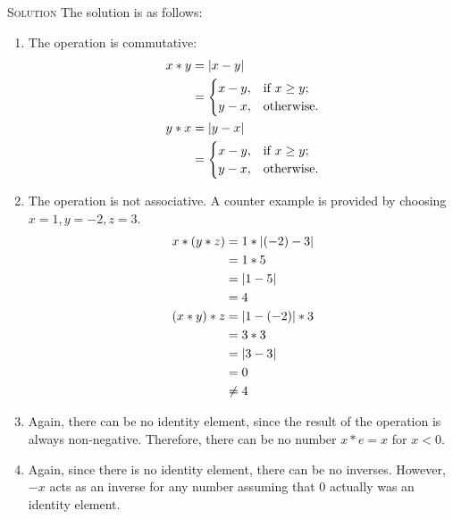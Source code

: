 \documentclass{amsart}
\newcommand{\Solution}{\textsc{Solution}\xspace}
\begin{document}
\begin{enumerate}
   \noindent \Solution The solution is as follows:
   \begin{enumerate}

      \item The operation is commutative:
      \begin{align*}
         x * y & = | x - y |           \\
	       & =
	       \begin{cases}
	          x - y,     & \text{if $x \ge y$;} \\
		  y - x,     & \text{otherwise.}
	       \end{cases} \notag \\
	 y * x & = | y - x |           \\
	       & =
	       \begin{cases}
	          x - y,     & \text{if $x \ge y$;} \\
		  y - x,     & \text{otherwise.}
	       \end{cases} \notag 
      \end{align*}

      \item The operation is not associative. A counter example is provided
      by choosing $x = 1, y = -2, z = 3$.
      \begin{align*}
         x * (y * z) & = 1 * |(-2) - 3|    \\
	             & = 1 * 5       \notag \\
		     & = | 1 - 5 |   \notag \\
		     & = 4           \notag \\
	 (x * y) * z & = | 1 - (-2) | * 3  \\
	             & = 3 * 3       \notag \\
		     & = | 3 - 3 |   \notag \\
		     & = 0           \notag \\
		     & \ne 4         \notag
      \end{align*}

      \item Again, there can be no identity element, since the result of
      the operation is always non-negative. Therefore, there can be 
      no number $x * e = x$ for $x < 0$.

      \item Again, since there is no identity element, there can be no inverses.
      However, $-x$ acts as an inverse for any number assuming that $0$ actually
      was an identity element.
   \end{enumerate}


\end{enumerate}
\end{document}
